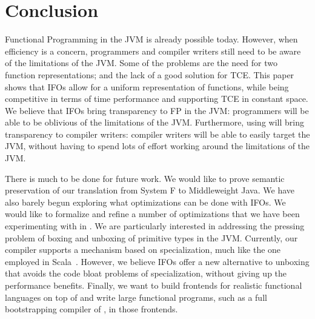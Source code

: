 \section{Conclusion}

Functional Programming in the JVM is already possible today. 
However, when efficiency is a concern, programmers and compiler 
writers still need to be aware of the limitations of the JVM. 
Some of the problems are the need for two function representations; 
and the lack of a good solution for TCE.
This paper shows that IFOs allow for a uniform representation of 
functions, while being competitive in terms of time performance and 
supporting TCE in constant space. We believe that IFOs 
bring transparency to FP in the JVM: programmers will be able to 
be oblivious of the limitations of the JVM. Furthermore, using \name 
will bring transparency to compiler writers: compiler writers will 
be able to easily target the JVM, without having to spend lots of 
effort working around the limitations of the JVM.

There is much to be done for future work. We would like to prove
semantic preservation of our translation from System F to Middleweight Java.
We have also barely begun exploring what optimizations can be done with IFOs. We
would like to formalize and refine a number of optimizations that we
have been experimenting with in \Name. We are particularly interested
in addressing the pressing problem of boxing and unboxing of primitive
types in the JVM. Currently, our compiler supports a mechanism based on
specialization, much like the one employed in Scala~\cite{dragos10compiling}. However,
we believe IFOs offer a new alternative to unboxing that avoids
the code bloat problems of specialization, without giving up the
performance benefits. Finally, we want to build frontends for
realistic functional languages on top of \name and write large
functional programs, such as a full bootstrapping compiler of \Name, in those frontends.

